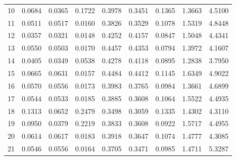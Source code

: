 \begin{anexosenv}
\begin{table}[htbp!]
\begin{tabular}{|l|l|l|l|l|l|l|l|l|}
10   & 0.0684  & 0.0365   & 0.1722               & 0.3978  & 0.3451   & 0.1365               & 1.3663  & 4.5100               \\
11   & 0.0511  & 0.0517   & 0.0160               & 0.3826  & 0.3529   & 0.1078               & 1.5319  & 4.8448               \\
12   & 0.0357  & 0.0321   & 0.0148               & 0.4252  & 0.4157   & 0.0847               & 1.5048  & 4.4341               \\
13   & 0.0550  & 0.0503   & 0.0170               & 0.4457  & 0.4353   & 0.0794               & 1.3972  & 4.1607               \\
14   & 0.0405  & 0.0349   & 0.0538               & 0.4278  & 0.4118   & 0.0895               & 1.2838  & 3.7950               \\
15   & 0.0665  & 0.0631   & 0.0157               & 0.4484  & 0.4412   & 0.1145               & 1.6349  & 4.9022               \\
16   & 0.0570  & 0.0556   & 0.0173               & 0.3983  & 0.3765   & 0.0984               & 1.3661  & 4.6899               \\
17   & 0.0544  & 0.0533   & 0.0185               & 0.3885  & 0.3608   & 0.1064               & 1.5522  & 4.4935               \\
18   & 0.1313  & 0.0652   & 0.2479               & 0.3498  & 0.3059   & 0.1335               & 1.4302  & 4.3110               \\
19   & 0.0950  & 0.0379   & 0.2219               & 0.3833  & 0.3608   & 0.0922               & 1.5717  & 4.4955               \\
20   & 0.0614  & 0.0617   & 0.0183               & 0.3918  & 0.3647   & 0.1074               & 1.4777  & 4.3085               \\
21   & 0.0546  & 0.0556   & 0.0164               & 0.3705  & 0.3471   & 0.0985               & 1.4711  & 5.3287              \\\hline
\end{tabular}
\end{table}



\end{anexosenv}
